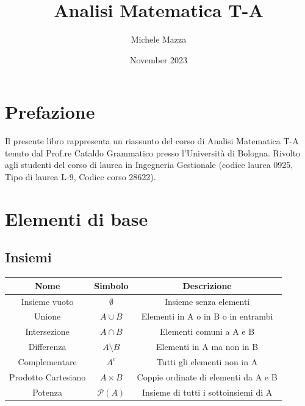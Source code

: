 \documentclass{book}
\title{Analisi Matematica T-A}
\author{Michele Mazza}
\date{November 2023}
\begin{document}
\frontmatter
\maketitle
\tableofcontents

\chapter*{Prefazione}
Il presente libro rappresenta un riassunto del corso di Analisi Matematica T-A tenuto dal Prof.re Cataldo Grammatico presso l'Università di Bologna. Rivolto agli studenti del corso di laurea in Ingegneria Gestionale (codice laurea 0925, Tipo di laurea L-9, Codice corso 28622).

\mainmatter
\chapter{Elementi di base}

\section{Insiemi}
\begin{center}
    \begin{tabular}{|c|c|c|}
        \hline
        \rowcolor{lightblue}
        Nome                & Simbolo            & Descrizione                          \\
        \hline
        Insieme vuoto       & \(\emptyset\)      & Insieme senza elementi               \\
        Unione              & \(A \cup B\)       & Elementi in A o in B o in entrambi   \\
        Intersezione        & \(A \cap B\)       & Elementi comuni a A e B              \\
        Differenza          & \(A \setminus B\)  & Elementi in A ma non in B            \\
        Complementare       & \(A^c\)            & Tutti gli elementi non in A          \\
        Prodotto Cartesiano & \(A \times B\)     & Coppie ordinate di elementi da A e B \\
        Potenza             & \(\mathcal{P}(A)\) & Insieme di tutti i sottoinsiemi di A \\
        \hline
    \end{tabular}
\end{center}
\end{document}
